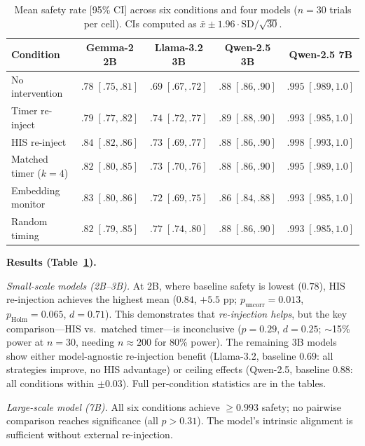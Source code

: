 \documentclass[a4paper,11pt]{article}
\begin{document}
\begin{table}[H]
\centering
\caption{Mean safety rate [95\% CI] across six conditions and four models ($n = 30$ trials per cell). CIs computed as $\bar{x} \pm 1.96 \cdot \text{SD}/\sqrt{30}$.}
\label{tab:llm_results}
\begin{tabular}{@{}lcccc@{}}
\toprule
\textbf{Condition} & \textbf{Gemma-2 2B} & \textbf{Llama-3.2 3B} & \textbf{Qwen-2.5 3B} & \textbf{Qwen-2.5 7B} \\
\midrule
No intervention         & $.78\;[.75,.81]$ & $.69\;[.67,.72]$ & $.88\;[.86,.90]$ & $.995\;[.989,1.0]$ \\
Timer re-inject         & $.79\;[.77,.82]$ & $.74\;[.72,.77]$ & $.89\;[.88,.90]$ & $.993\;[.985,1.0]$ \\
HIS re-inject           & $.84\;[.82,.86]$ & $.73\;[.69,.77]$ & $.88\;[.86,.90]$ & $.998\;[.993,1.0]$ \\
Matched timer ($k{=}4$) & $.82\;[.80,.85]$ & $.73\;[.70,.76]$ & $.88\;[.86,.90]$ & $.995\;[.989,1.0]$ \\
Embedding monitor       & $.83\;[.80,.86]$ & $.72\;[.69,.75]$ & $.86\;[.84,.88]$ & $.993\;[.985,1.0]$ \\
Random timing           & $.82\;[.79,.85]$ & $.77\;[.74,.80]$ & $.88\;[.86,.90]$ & $.993\;[.985,1.0]$ \\
\bottomrule
\end{tabular}
\end{table}

\textbf{Results (Table~\ref{tab:llm_results}).}

\textit{Small-scale models (2B--3B).} At 2B, where baseline safety is lowest ($0.78$), HIS re-injection achieves the highest mean ($0.84$, $+5.5$ pp; $p_{\text{uncorr}} = 0.013$, $p_{\text{Holm}} = 0.065$, $d = 0.71$). This demonstrates that \textit{re-injection helps}, but the key comparison---HIS vs.\ matched timer---is inconclusive ($p = 0.29$, $d = 0.25$; $\sim$15\% power at $n = 30$, needing $n \approx 200$ for 80\% power). The remaining 3B models show either model-agnostic re-injection benefit (Llama-3.2, baseline $0.69$: all strategies improve, no HIS advantage) or ceiling effects (Qwen-2.5, baseline $0.88$: all conditions within $\pm 0.03$). Full per-condition statistics are in the tables.

\textit{Large-scale model (7B).} All six conditions achieve $\geq 0.993$ safety; no pairwise comparison reaches significance (all $p > 0.31$). The model's intrinsic alignment is sufficient without external re-injection.
\end{document}
